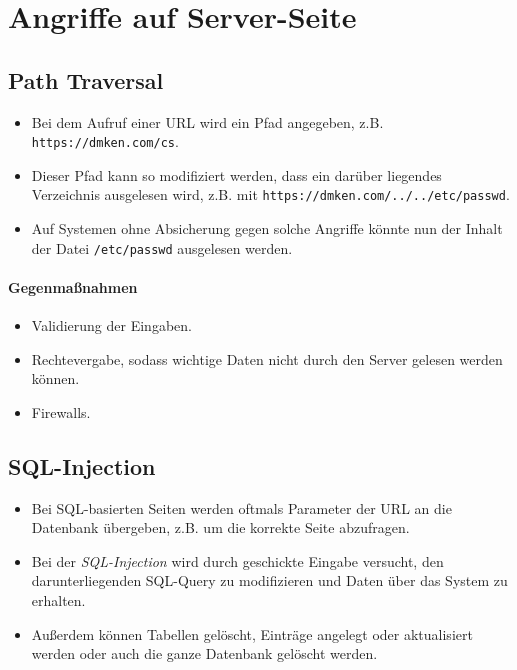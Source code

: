 \section{Angriffe auf Server-Seite}
	\subsection{Path Traversal}
		\begin{itemize}
			\item Bei dem Aufruf einer URL wird ein Pfad angegeben, z.B. \texttt{https://dmken.com/cs}.
			\item Dieser Pfad kann so modifiziert werden, dass ein darüber liegendes Verzeichnis ausgelesen wird, z.B. mit \texttt{https://dmken.com/../../etc/passwd}.
			\item Auf Systemen ohne Absicherung gegen solche Angriffe könnte nun der Inhalt der Datei \texttt{/etc/passwd} ausgelesen werden.
		\end{itemize}

		\paragraph{Gegenmaßnahmen}
			\begin{itemize}
				\item Validierung der Eingaben.
				\item Rechtevergabe, sodass wichtige Daten nicht durch den Server gelesen werden können.
				\item Firewalls.
			\end{itemize}

	\subsection{SQL-Injection}
		\begin{itemize}
			\item Bei SQL-basierten Seiten werden oftmals Parameter der URL an die Datenbank übergeben, z.B. um die korrekte Seite abzufragen.
			\item Bei der \textit{SQL-Injection} wird durch geschickte Eingabe versucht, den darunterliegenden SQL-Query zu modifizieren und Daten über das System zu erhalten.
			\item Außerdem können Tabellen gelöscht, Einträge angelegt oder aktualisiert werden oder auch die ganze Datenbank gelöscht werden.
		\end{itemize}

